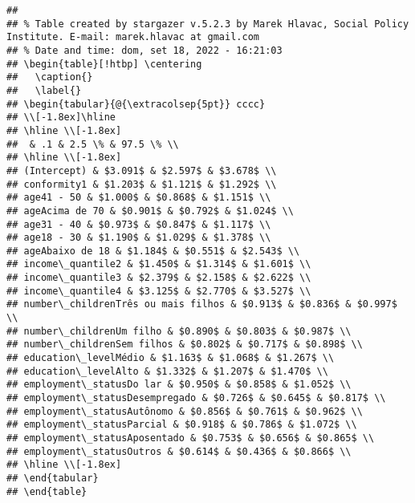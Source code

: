 \documentclass[
]{article}
\begin{document}
\begin{verbatim}
## 
## % Table created by stargazer v.5.2.3 by Marek Hlavac, Social Policy Institute. E-mail: marek.hlavac at gmail.com
## % Date and time: dom, set 18, 2022 - 16:21:03
## \begin{table}[!htbp] \centering 
##   \caption{} 
##   \label{} 
## \begin{tabular}{@{\extracolsep{5pt}} cccc} 
## \\[-1.8ex]\hline 
## \hline \\[-1.8ex] 
##  & .1 & 2.5 \% & 97.5 \% \\ 
## \hline \\[-1.8ex] 
## (Intercept) & $3.091$ & $2.597$ & $3.678$ \\ 
## conformity1 & $1.203$ & $1.121$ & $1.292$ \\ 
## age41 - 50 & $1.000$ & $0.868$ & $1.151$ \\ 
## ageAcima de 70 & $0.901$ & $0.792$ & $1.024$ \\ 
## age31 - 40 & $0.973$ & $0.847$ & $1.117$ \\ 
## age18 - 30 & $1.190$ & $1.029$ & $1.378$ \\ 
## ageAbaixo de 18 & $1.184$ & $0.551$ & $2.543$ \\ 
## income\_quantile2 & $1.450$ & $1.314$ & $1.601$ \\ 
## income\_quantile3 & $2.379$ & $2.158$ & $2.622$ \\ 
## income\_quantile4 & $3.125$ & $2.770$ & $3.527$ \\ 
## number\_childrenTrês ou mais filhos & $0.913$ & $0.836$ & $0.997$ \\ 
## number\_childrenUm filho & $0.890$ & $0.803$ & $0.987$ \\ 
## number\_childrenSem filhos & $0.802$ & $0.717$ & $0.898$ \\ 
## education\_levelMédio & $1.163$ & $1.068$ & $1.267$ \\ 
## education\_levelAlto & $1.332$ & $1.207$ & $1.470$ \\ 
## employment\_statusDo lar & $0.950$ & $0.858$ & $1.052$ \\ 
## employment\_statusDesempregado & $0.726$ & $0.645$ & $0.817$ \\ 
## employment\_statusAutônomo & $0.856$ & $0.761$ & $0.962$ \\ 
## employment\_statusParcial & $0.918$ & $0.786$ & $1.072$ \\ 
## employment\_statusAposentado & $0.753$ & $0.656$ & $0.865$ \\ 
## employment\_statusOutros & $0.614$ & $0.436$ & $0.866$ \\ 
## \hline \\[-1.8ex] 
## \end{tabular} 
## \end{table}
\end{verbatim}
\end{document}
